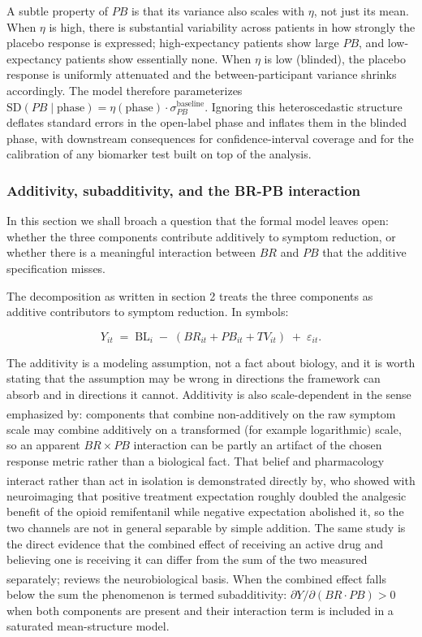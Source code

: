 \documentclass[
  11pt,
]{article}
\newcounter{none} %
\begin{document}
A subtle property of \(PB\) is that its variance also scales with \(\eta\), not
just its mean. When \(\eta\) is high, there is substantial variability across
patients in how strongly the placebo response is expressed; high-expectancy
patients show large \(PB\), and low-expectancy patients show essentially none.
When \(\eta\) is low (blinded), the placebo response is uniformly attenuated and
the between-participant variance shrinks accordingly. The model therefore
parameterizes \(\mathrm{SD}(PB \mid \text{phase}) = \eta(\text{phase}) \cdot
\sigma_{PB}^{\text{baseline}}\). Ignoring this heteroscedastic structure
deflates standard errors in the open-label phase and inflates them in the
blinded phase, with downstream consequences for confidence-interval coverage
and for the calibration of any biomarker test built on top of the analysis.

\subsubsection{Additivity, subadditivity, and the BR-PB interaction}\label{additivity-subadditivity-and-the-br-pb-interaction}

In this section we shall broach a question that the formal model leaves open:
whether the three components contribute additively to symptom reduction, or
whether there is a meaningful interaction between \(BR\) and \(PB\) that the
additive specification misses.

The decomposition as written in section 2 treats the three components as
additive contributors to symptom reduction. In symbols:

\[ Y_{it} \;=\; \mathrm{BL}_i \;-\; (BR_{it} + PB_{it} + TV_{it}) \;+\;
\varepsilon_{it}. \]

The additivity is a modeling assumption, not a fact about biology, and it is
worth stating that the assumption may be wrong in directions the framework can
absorb and in directions it cannot. Additivity is also scale-dependent in the
sense emphasized by\textsuperscript{}: components that combine non-additively on the
raw symptom scale may combine additively on a transformed (for example
logarithmic) scale, so an apparent \(BR \times PB\) interaction can be partly an
artifact of the chosen response metric rather than a biological fact. That
belief and pharmacology interact rather than act in isolation is demonstrated
directly by\textsuperscript{}, who showed with neuroimaging that positive treatment
expectation roughly doubled the analgesic benefit of the opioid remifentanil
while negative expectation abolished it, so the two channels are not in
general separable by simple addition. The same study is the direct evidence that the combined effect of
receiving an active drug and believing one is receiving it can differ
from the sum of the two measured separately;\textsuperscript{} reviews the
neurobiological basis. When the combined effect falls below the sum the
phenomenon is termed subadditivity: \(\partial Y / \partial(BR \cdot
PB) > 0\) when both components are present and their interaction term is
included in a saturated mean-structure model.
\end{document}
